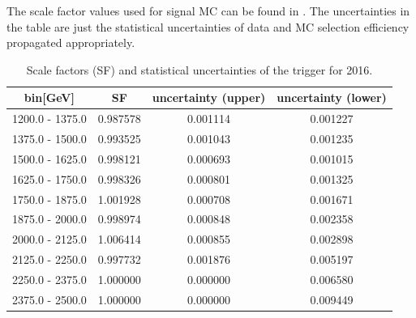 The scale factor values used for signal MC can be found in . The uncertainties in the table are just the statistical uncertainties of data and MC selection efficiency propagated appropriately.


\begin{table}[b]
	\centering
	\caption{Scale factors (SF) and statistical uncertainties of the \HT trigger for 2016.}
	\label{tab:2016_triggerSF}
	\begin{tabular}{cccc}
		\hline
		\HT bin[GeV]    & SF       & uncertainty (upper) & uncertainty (lower) \\
		\hline
		1200.0 - 1375.0 & 0.987578 & 0.001114            & 0.001227            \\
		1375.0 - 1500.0 & 0.993525 & 0.001043            & 0.001235            \\
		1500.0 - 1625.0 & 0.998121 & 0.000693            & 0.001015            \\
		1625.0 - 1750.0 & 0.998326 & 0.000801            & 0.001325            \\
		1750.0 - 1875.0 & 1.001928 & 0.000708            & 0.001671            \\
		1875.0 - 2000.0 & 0.998974 & 0.000848            & 0.002358            \\
		2000.0 - 2125.0 & 1.006414 & 0.000855            & 0.002898            \\
		2125.0 - 2250.0 & 0.997732 & 0.001876            & 0.005197            \\
		2250.0 - 2375.0 & 1.000000 & 0.000000            & 0.006580            \\
		2375.0 - 2500.0 & 1.000000 & 0.000000            & 0.009449            \\
		\hline
	\end{tabular}
\end{table}

